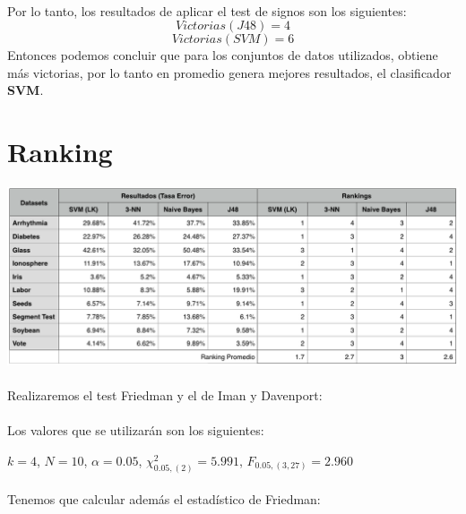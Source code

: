\documentclass[10pt, a4paper,spanish]{article}
\begin{document}
		\paragraph{}
		Por lo tanto, los resultados de aplicar el test de signos son los siguientes:
		\[Victorias(J48) = 4\]
		\[Victorias(SVM) = 6\]
		Entonces podemos concluir que para los conjuntos de datos utilizados, obtiene más victorias, por lo tanto en promedio genera mejores resultados, el clasificador \textbf{SVM}.

	\section{Ranking}

        \paragraph{}

		\begin{center}
			\includegraphics[width=\textwidth]{ranking-table}
		\end{center}

		\paragraph{}
		Realizaremos el test Friedman y el de Iman y Davenport:

		\paragraph{}
		Los valores que se utilizarán son los siguientes:

		$k = 4$, $N =10$,
		$\alpha = 0.05$,
		$\chi_{0.05,(2)}^2= 5.991$,
		$F_{0.05, (3,27)} =  2.960$

		\paragraph{}
		Tenemos que calcular además el estadístico de Friedman:
\end{document}
